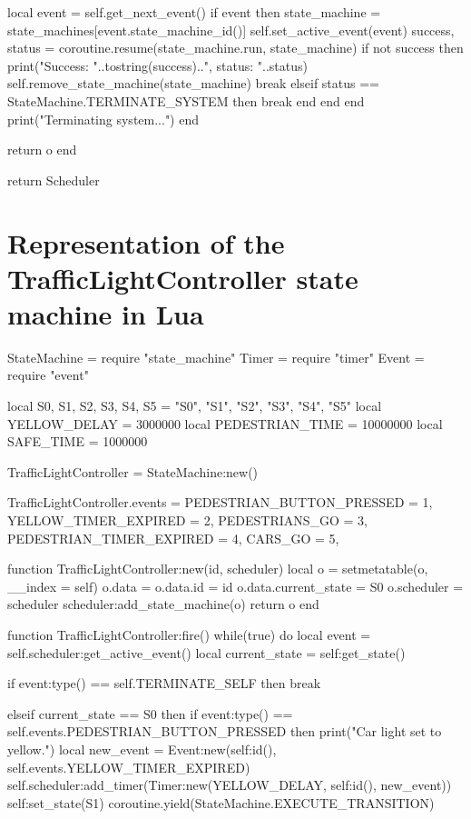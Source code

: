 \begin{appendices}
\begin{listing}[H]
\begin{luacode}
			local event = self.get_next_event()
			if event then
				state_machine = state_machines[event.state_machine_id()]
				self.set_active_event(event)
				success, status = coroutine.resume(state_machine.run, state_machine)
				if not success then
					print("Success: "..tostring(success)..", status: "..status)
					self.remove_state_machine(state_machine)
					break
				elseif status == StateMachine.TERMINATE_SYSTEM then
					break
				end
			end
		end
		print("Terminating system...")
	end

	return o
end

return Scheduler
\end{luacode}
\end{listing}

\chapter{Representation of the TrafficLightController state machine in Lua}
\label{app:traffic_light}

\begin{luacode}
StateMachine = require "state_machine"
Timer = require "timer"
Event = require "event"

local S0, S1, S2, S3, S4, S5 = "S0", "S1", "S2", "S3", "S4", "S5"
local YELLOW_DELAY = 3000000
local PEDESTRIAN_TIME = 10000000
local SAFE_TIME = 1000000

TrafficLightController = StateMachine:new()

TrafficLightController.events = {
	PEDESTRIAN_BUTTON_PRESSED = 1,
	YELLOW_TIMER_EXPIRED = 2,
	PEDESTRIANS_GO = 3,
	PEDESTRIAN_TIMER_EXPIRED = 4,
	CARS_GO = 5,
}

function TrafficLightController:new(id, scheduler)
	local o = {}
	setmetatable(o, { __index = self})
	o.data = {}
	o.data.id = id
	o.data.current_state = S0
	o.scheduler = scheduler
	scheduler:add_state_machine(o)
	return o
end

function TrafficLightController:fire()
	while(true) do
		local event = self.scheduler:get_active_event()
		local current_state = self:get_state()

		if event:type() == self.TERMINATE_SELF then
			break

		elseif current_state == S0 then
			if event:type() == self.events.PEDESTRIAN_BUTTON_PRESSED then
				print("Car light set to yellow.")
				local new_event = Event:new(self:id(), self.events.YELLOW_TIMER_EXPIRED)
				self.scheduler:add_timer(Timer:new(YELLOW_DELAY, self:id(), new_event))
				self:set_state(S1)
				coroutine.yield(StateMachine.EXECUTE_TRANSITION)


\end{luacode}
\end{appendices}
